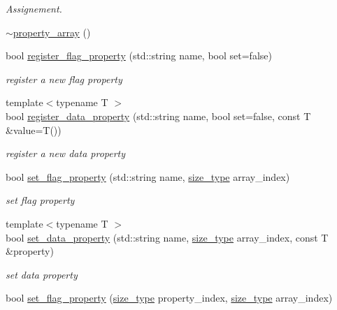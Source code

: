 \begin{DoxyCompactItemize}
\begin{DoxyCompactList}\small\item\em \-Assignement. \end{DoxyCompactList}\item 
\hyperlink{classlb_1_1property__array_ae090553ebe3d1b393089a3606a69e5f1}{$\sim$property\-\_\-array} ()
\item 
bool \hyperlink{classlb_1_1property__array_a25cf1fb45de2be0a8a34c29ebfb9a943}{register\-\_\-flag\-\_\-property} (std\-::string name, bool set=false)
\begin{DoxyCompactList}\small\item\em register a new flag property \end{DoxyCompactList}\item 
{\footnotesize template$<$typename T $>$ }\\bool \hyperlink{classlb_1_1property__array_a52ef100619136729c5ed5871fe128612}{register\-\_\-data\-\_\-property} (std\-::string name, bool set=false, const \-T \&value=\-T())
\begin{DoxyCompactList}\small\item\em register a new data property \end{DoxyCompactList}\item 
bool \hyperlink{classlb_1_1property__array_ae8128b50f33097f3a9a81fb9c8036ece}{set\-\_\-flag\-\_\-property} (std\-::string name, \hyperlink{classlb_1_1property__array_a76d861a6fb4b99128f627ad951918429}{size\-\_\-type} array\-\_\-index)
\begin{DoxyCompactList}\small\item\em set flag property \end{DoxyCompactList}\item 
{\footnotesize template$<$typename T $>$ }\\bool \hyperlink{classlb_1_1property__array_a9dd2543e041fb3b6869544d9a4096823}{set\-\_\-data\-\_\-property} (std\-::string name, \hyperlink{classlb_1_1property__array_a76d861a6fb4b99128f627ad951918429}{size\-\_\-type} array\-\_\-index, const \-T \&property)
\begin{DoxyCompactList}\small\item\em set data property \end{DoxyCompactList}\item 
bool \hyperlink{classlb_1_1property__array_a7506bd327ec5db0640d8518bfc4eba9b}{set\-\_\-flag\-\_\-property} (\hyperlink{classlb_1_1property__array_a76d861a6fb4b99128f627ad951918429}{size\-\_\-type} property\-\_\-index, \hyperlink{classlb_1_1property__array_a76d861a6fb4b99128f627ad951918429}{size\-\_\-type} array\-\_\-index)

\end{DoxyCompactItemize}
